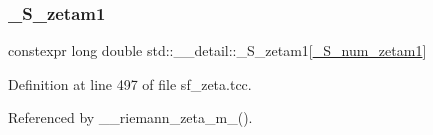 \subsubsection{\texorpdfstring{\+\_\+\+S\+\_\+zetam1}{\_S\_zetam1}}
{\footnotesize\ttfamily constexpr long double std\+::\+\_\+\+\_\+detail\+::\+\_\+\+S\+\_\+zetam1\mbox{[}\hyperlink{namespacestd_1_1____detail_a807e36c2aec3a9f27fdb21726cd464e2}{\+\_\+\+S\+\_\+num\+\_\+zetam1}\mbox{]}}



Definition at line 497 of file sf\+\_\+zeta.\+tcc.



Referenced by \+\_\+\+\_\+riemann\+\_\+zeta\+\_\+m\+\_().

